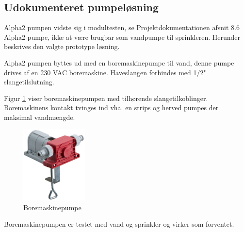 
\subsection{Udokumenteret pumpeløsning}

Alpha2 pumpen vidste sig i modultesten, se Projektdokumentationen afsnit 8.6 Alpha2 pumpe, ikke at være brugbar som vandpumpe til sprinkleren. Herunder beskrives den valgte prototype løsning.

Alpha2 pumpen byttes ud med en boremaskinepumpe til vand, denne pumpe drives af en 230 VAC boremaskine. Haveslangen forbindes med 1/2" slangetilslutning. 

Figur \ref{fig:boremaskinepumpe} viser boremaskinepumpen med tilhørende slangetilkoblinger. Boremaskinens kontakt tvinges ind vha. en strips og herved pumpes der maksimal vandmængde. 

\begin{figure}[h]
  \centering
    \includegraphics[width=0.3\textwidth]{Billeder/boremaskinepumpe}
    \caption{Boremaskinepumpe}
    \label{fig:boremaskinepumpe}
\end{figure}

Boremaskinepumpen er testet med vand og sprinkler og virker som forventet. 